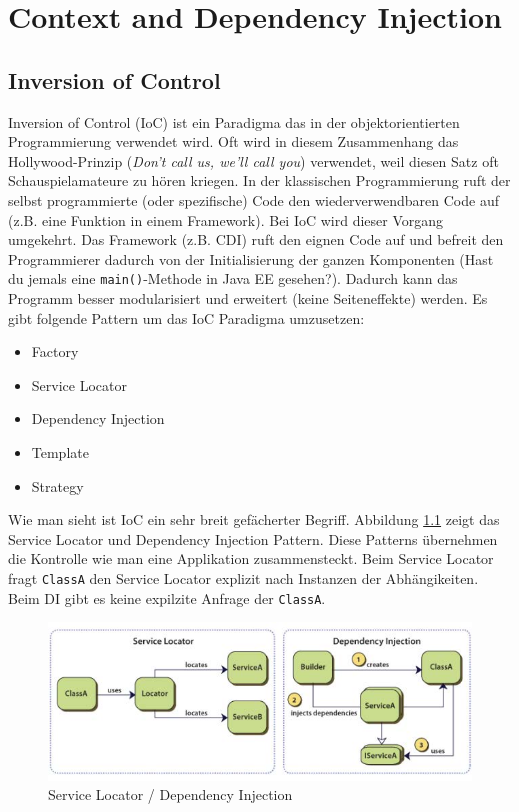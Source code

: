 \chapter{Context and Dependency Injection}
 
\section{Inversion of Control}
\label{sec:ioc}

Inversion of Control (IoC) ist ein Paradigma das in der objektorientierten Programmierung verwendet wird.  Oft wird in diesem Zusammenhang das Hollywood-Prinzip (\emph{Don't call us, we'll call you}) verwendet, weil diesen Satz oft Schauspielamateure zu hören kriegen. In der klassischen Programmierung ruft der selbst programmierte (oder spezifische) Code den wiederverwendbaren Code auf (z.B. eine Funktion in einem Framework). Bei IoC wird dieser Vorgang umgekehrt. Das Framework (z.B. CDI) ruft den eignen Code auf und befreit den Programmierer dadurch von der Initialisierung der ganzen Komponenten (Hast du jemals eine \verb|main()|-Methode in Java EE gesehen?). Dadurch kann das Programm besser modularisiert und erweitert (keine Seiteneffekte) werden. Es gibt folgende Pattern um das IoC Paradigma umzusetzen:
\begin{itemize}
	\item Factory
	\item Service Locator
	\item Dependency Injection
	\item Template
	\item Strategy
\end{itemize}
Wie man sieht ist IoC ein sehr breit gefächerter Begriff. Abbildung \ref{fig:service-locator-di} zeigt das Service Locator und Dependency Injection Pattern. Diese Patterns übernehmen die Kontrolle wie man eine Applikation zusammensteckt. Beim Service Locator fragt \verb|ClassA| den Service Locator explizit nach Instanzen der Abhängikeiten. Beim DI gibt es keine expilzite Anfrage der \verb|ClassA|.

\begin{figure}
\centering
\includegraphics[width=0.7\linewidth]{fig/service-locator-di}
\caption{Service Locator / Dependency Injection}
\label{fig:service-locator-di}
\end{figure}

